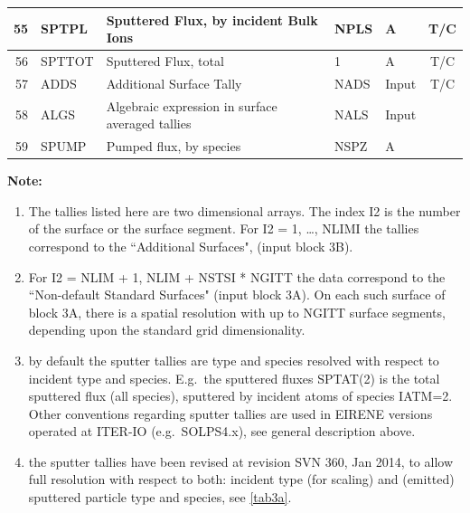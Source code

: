 \begin{landscape}
\begin{longtable}{|r|l|l|l|l|c|}
    \\    \hline
    55                       & SPTPL                  & Sputtered Flux, by
    incident Bulk Ions       & NPLS
                             & \si{\ampere}           & T/C
    \\  \hline
    56                       & SPTTOT                 & Sputtered Flux, total
                             & 1
                             & \si{\ampere}           & T/C
    \\  \hline\hline
    57                       & ADDS                   & Additional Surface Tally
                             & NADS
                             & Input                  & T/C
    \\  \hline
    58                       & ALGS                   & Algebraic expression in
    surface averaged tallies & NALS
                             & Input                  &
    \\  \hline
    59                       & SPUMP                  & Pumped flux, by species
                             & NSPZ
                             & \si{\ampere}           &
    \\  \hline
  \end{longtable}

  \textbf{Note:} 

  \begin{enumerate}
    \item The tallies listed here are two dimensional arrays.
	  The  index I2 is the number of the surface or the surface
	  segment.
	  For I2 = 1, \dots, NLIMI the tallies correspond to the ``Additional Surfaces",
	  (input block 3B).
    \item For I2 = NLIM + 1, NLIM + NSTSI * NGITT the data correspond to the
	  ``Non-default Standard Surfaces" (input block 3A).
	  On each such surface of block 3A, there is a spatial resolution with up to
	  NGITT surface segments, depending upon the standard grid dimensionality.
    \item by default the sputter tallies are type and species resolved with
	  respect to incident type and species.
	  E.g.\ the sputtered fluxes SPTAT(2) is the total sputtered flux (all species),
	  sputtered by incident atoms of species IATM=2.
	  Other conventions regarding sputter tallies are used in EIRENE versions
	  operated at ITER-IO (e.g.\ SOLPS4.x), see general description above.
    \item the sputter tallies have been revised at revision SVN 360, Jan 2014,
	  to allow full resolution with respect to both: incident type (for scaling) and
	  (emitted) sputtered particle type and species, see \cref{tab3a}.
  \end{enumerate}


\end{landscape}
